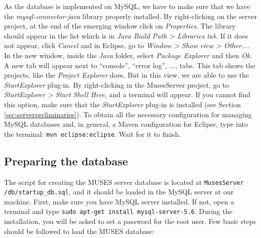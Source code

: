 \documentclass[a4paper,11pt]{book}
\begin{document}
As the database is implemented on MySQL, we have to make sure that we have the \textit{mysql-connector-java} library properly installed. By right-clicking on the server project, at the end of the emerging window click on \textit{Properties}. The library should appear in the list which is in \textit{Java Build Path > Libraries tab}. If it does not appear, click \textit{Cancel} and in Eclipse, go to \textit{Window > Show view > Other...}. In the new window, inside the \textit{Java} folder, select \textit{Package Explorer} and then \textit{Ok}. A new tab will appear next to ``console'', ``error log'', ..., tabs. This tab shows the projects, like the \textit{Project Explorer} does. But in this view, we are able to use the \textit{StartExplorer} plug-in. By right-clicking in the MusesServer project, go to \textit{StartExplorer > Start Shell Here}, and a terminal will appear. If you cannot find this option, make sure that the \textit{StartExplorer} plug-in is installed (see Section \ref{sec:serverpreliminaries}). To obtain all the necessary configuration for managing MySQL databases and, in general, a Maven configuration for Eclipse, type into the terminal: \texttt{mvn eclipse:eclipse}. Wait for it to finish.

\subsection{Preparing the database}
\label{subsec:database}

The script for creating the MUSES server database is located at \texttt{MusesServer\\/db/startup\_db.sql}, and it should be loaded in the MySQL server at our machine. First, make sure you have MySQL server installed. If not, open a terminal and type \texttt{sudo apt-get install mysql-server-5.6}. During the installation, you will be asked to set a password for the root user. Few basic steps \cite{mysqlguide:site} should be followed to load the MUSES database:
\end{document}
